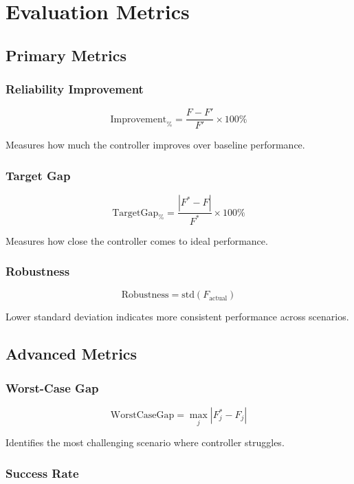 \documentclass[11pt,a4paper]{article}
\begin{document}
\section{Evaluation Metrics}

\subsection{Primary Metrics}

\subsubsection{Reliability Improvement}

$$
\text{Improvement}_{\%} = \frac{F - F'}{F'} \times 100\%
$$

Measures how much the controller improves over baseline performance.

\subsubsection{Target Gap}

$$
\text{TargetGap}_{\%} = \frac{|F^* - F|}{F^*} \times 100\%
$$

Measures how close the controller comes to ideal performance.

\subsubsection{Robustness}

$$
\text{Robustness} = \text{std}(F_{\text{actual}})
$$

Lower standard deviation indicates more consistent performance across scenarios.

\subsection{Advanced Metrics}

\subsubsection{Worst-Case Gap}

$$
\text{WorstCaseGap} = \max_{j} |F^*_j - F_j|
$$

Identifies the most challenging scenario where controller struggles.

\subsubsection{Success Rate}
\end{document}
